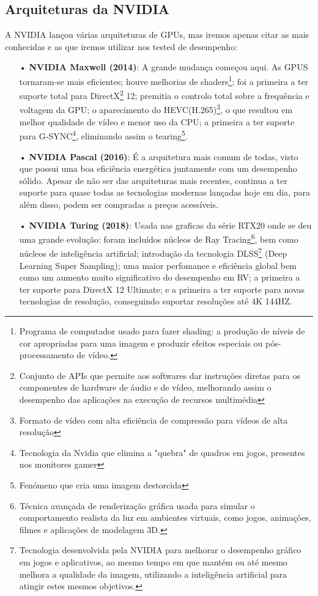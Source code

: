 \documentclass[a4paper,11pt,]{report}
\begin{document}
\subsection{Arquiteturas da NVIDIA}
A NVIDIA lançou várias arquiteturas de GPUs, mas iremos apenas citar as mais conhecidas e as que iremos utilizar nos tested de desempenho:
\begin{itemize}
 \item[•] \textbf{NVIDIA Maxwell (2014)}: A grande mudança começou aqui. As GPUS tornaram-se mais eficientes; houve melhorias de shaders\footnote{Programa de computador usado para fazer shading: a produção de níveis de cor apropriadas para uma imagem e produzir efeitos especiais ou pós-processamento de vídeo.}; foi a primeira a ter suporte total para DirectX\footnote{Conjunto de APIs que permite aos softwares dar instruções diretas para os componentes de hardware de áudio e de vídeo, melhorando assim o desempenho das aplicações na execução de recursos multimédia} 12; premitia o controlo total sobre a frequência e voltagem da GPU; o aparecimento do HEVC(H.265)\footnote{Formato de vídeo com alta eficiência de compressão para vídeos de alta resolução}, o que resultou em melhor qualidade de vídeo e menor uso da CPU; a primeira a ter suporte para G-SYNC\footnote{Tecnologia da Nvidia que elimina a "quebra" de quadros em jogos, presentes nos monitores gamer}, eliminando assim o tearing\footnote{Fenómeno que cria uma imagem destorcida}.
 \item[•] \textbf{NVIDIA Pascal (2016)}: É a arquitetura mais comum de todas, visto que possui uma boa eficiência energética juntamente com um desempenho sólido. Apesar de não ser das  arquiteturas mais recentes, continua a ter suporte para quase todas as tecnologias modernas lançadas hoje em dia, para além disso, podem ser compradas a preços acessíveis.
\pagebreak
 \item[•] \textbf{NVIDIA Turing (2018)}: Usada nas graficas da série RTX20 onde se deu uma grande evolução: foram incluídos núcleos de Ray Tracing\footnote{Técnica avançada de renderização gráfica usada para simular o comportamento realista da luz em ambientes virtuais, como jogos, animações, filmes e aplicações de modelagem 3D.}, bem como núcleos de inteligência artificial; introdução da tecnologia DLSS\footnote{Tecnologia desenvolvida pela NVIDIA para melhorar o desempenho gráfico em jogos e aplicativos, ao mesmo tempo em que mantém ou até mesmo melhora a qualidade da imagem, utilizando a inteligência artificial para atingir estes mesmos objetivos.} (Deep Learning Super Sampling); uma maior perfomance e eficiência global bem como um aumento muito significativo do desempenho em RV; a primeira a ter suporte para DirectX 12 Ultimate; e a primeira a ter suporte para novas tecnologias de resolução, conseguindo suportar resoluções até 4K 144HZ.

\end{itemize}
\end{document}
